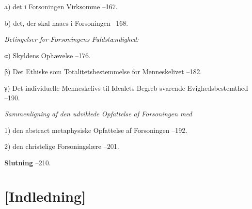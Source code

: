 \begin{list}{}{%
  \setlength{\leftmargin}{2.2em}\setlength{\itemindent}{-2.2em}%
  \setlength{\itemsep}{2pt}\setlength{\parsep}{0pt}}
\item[] \hspace{2.4em} a) det i Forsoningen Virksomme --167.
\item[] \hspace{2.4em} b) det, der skal naaes i Forsoningen --168.
\item[] \hspace{2.4em} \emph{Betingelser for Forsoningens Fuldstændighed:}
\item[] \hspace{2.4em} α) Skyldens Ophævelse --176.
\item[] \hspace{2.4em} β) Det Ethiske som Totalitetsbestemmelse for
  Menneskelivet --182.
\item[] \hspace{2.4em} γ) Det individuelle Menneskelivs til Idealets
  Begreb svarende Evighedsbestemthed --190.
\item[] \hspace{1.2em} \emph{Sammenligning af den udviklede Opfattelse af
  Forsoningen med}
\item[] \hspace{1.2em} 1) den abstract metaphysiske Opfattelse af
  Forsoningen --192.
\item[] \hspace{1.2em} 2) den christelige Forsoningslære --201.

\item \textbf{Slutning} --210.

\end{list}
\endgroup


\chapter*{[Indledning]}

